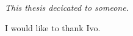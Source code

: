 \begin{Dedication}
\vfill
\begin{flushright}
\textit
{
    This thesis decicated to someone.
}
\end{flushright}
\end{Dedication}




\begin{Acknowledgments}
\setlength{\baselineskip}{1.5\baselineskip}
{
    I would like to thank Ivo.
}
\end{Acknowledgments}

